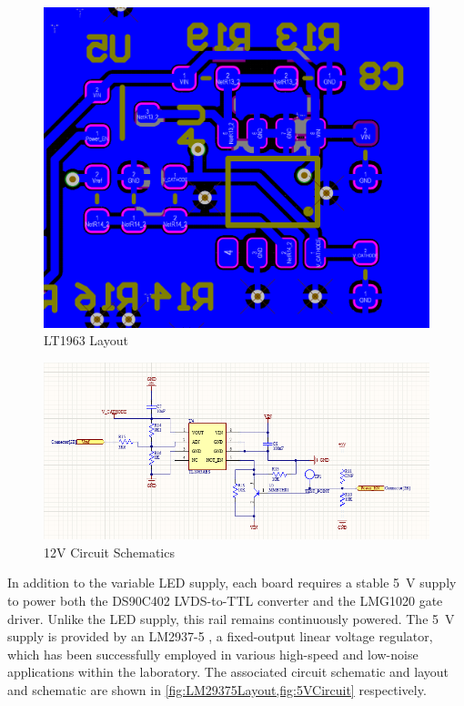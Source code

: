 \documentclass[a4paper,11pt]{article}
\begin{document}
\begin{figure}[htbp]
\centering
\includegraphics[scale=0.5]{LT1963layout.png}
\caption{LT1963 Layout\label{fig:LT1963Layout}}
\end{figure}

\begin{figure}[h]
\centering
\includegraphics[scale=0.7]{12VVariablePSU.png}
\caption{12V Circuit Schematics\label{fig:12VVariablePSU}}
\end{figure}

In addition to the variable LED supply, each board requires a stable 5~V supply to power both the DS90C402 LVDS-to-TTL converter and the LMG1020 gate driver. Unlike the LED supply, this rail remains continuously powered. The 5~V supply is provided by an LM2937-5 \cite{LM2347-5}, a fixed-output linear voltage regulator, which has been successfully employed in various high-speed and low-noise applications within the laboratory. The associated circuit schematic and layout and schematic are shown in \cref{fig:LM29375Layout,fig:5VCircuit} respectively.
\end{document}

